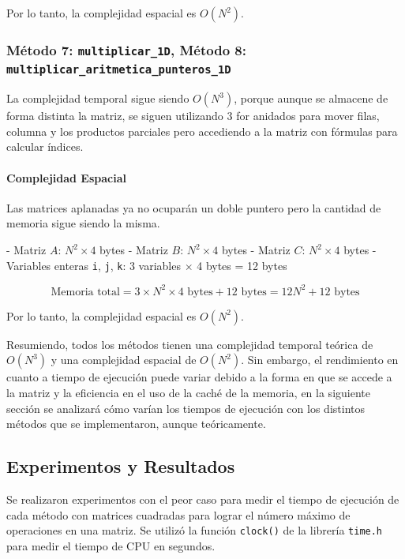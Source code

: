 \documentclass[10pt]{article}
\begin{document}
Por lo tanto, la complejidad espacial es $O(N^2)$.

\subsubsection{Método 7: \texttt{multiplicar\_1D}, Método 8: \texttt{multiplicar\_aritmetica\_punteros\_1D}}

La complejidad temporal sigue siendo $O(N^3)$, porque aunque se almacene de forma distinta la matriz, se siguen utilizando 3 for anidados para mover filas, columna y los productos parciales pero accediendo a la matriz con fórmulas para calcular índices.

\paragraph{Complejidad Espacial}

Las matrices aplanadas ya no ocuparán un doble puntero pero la cantidad de memoria sigue siendo la misma.

- Matriz $A$: $N^2 \times 4$ bytes
- Matriz $B$: $N^2 \times 4$ bytes
- Matriz $C$: $N^2 \times 4$ bytes
- Variables enteras \texttt{i}, \texttt{j}, \texttt{k}: 3 variables $\times$ 4 bytes = 12 bytes

\[
\text{Memoria total} = 3 \times N^2 \times 4 \text{ bytes} + 12 \text{ bytes} = 12N^2 + 12 \text{ bytes}
\]

Por lo tanto, la complejidad espacial es $O(N^2)$.

Resumiendo, todos los métodos tienen una complejidad temporal teórica de $O(N^3)$ y una complejidad espacial de $O(N^2)$. Sin embargo, el rendimiento en cuanto a tiempo de ejecución puede variar debido a la forma en que se accede a la matriz y la eficiencia en el uso de la caché de la memoria, en la siguiente sección se analizará cómo varían los tiempos de ejecución con los distintos métodos que se implementaron, aunque teóricamente.

\subsection{Experimentos y Resultados}

Se realizaron experimentos con el peor caso para medir el tiempo de ejecución de cada método con matrices cuadradas para lograr el número máximo de operaciones en una matriz. Se utilizó la función \texttt{clock()} de la librería \texttt{time.h} para medir el tiempo de CPU en segundos.\\
\end{document}
